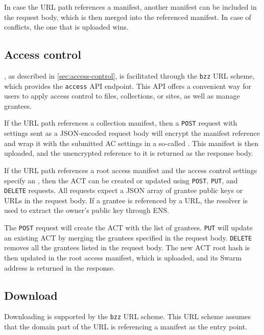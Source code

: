 In case the URL path references a manifest, another manifest can be included in the request body, which is then merged into the referenced manifest. In case of conflicts, the one that is uploaded wins. 


\subsection{Access control \statusgreen}\label{sec:access-control-ux}

, as described in  \ref{sec:access-control}, is facilitated through  the \lstinline{bzz} URL scheme, which provides the \lstinline{access} API endpoint. This API offers a convenient way for users to apply access control to files, collections, or sites, as well as manage grantees.

If the URL path references a collection manifest, then a \lstinline{POST} request with  settings sent as a JSON-encoded request body will encrypt the manifest reference and wrap it with the submitted AC settings in a so-called . This manifest is then uploaded, and the unencrypted reference to it is returned as the response body. 

If the URL path references a root access manifest and the access control settings specify an , then the ACT can be created or updated using \lstinline{POST}, \lstinline{PUT}, and \lstinline{DELETE} requests. All requests expect a JSON array of grantee public keys or URLs in the request body. If a grantee is referenced by a URL, the resolver is used to extract the owner's public key through ENS.

The \lstinline{POST} request will create the ACT with the list of grantees. \lstinline{PUT} will update an existing ACT by merging the grantees specified in the request body. \lstinline{DELETE} removes all the grantees listed in the request body. The new ACT root hash is then updated in the root access manifest, which is uploaded, and its Swarm address is returned in the response.



\subsection{Download \statusgreen}\label{sec:download}

Downloading is supported by the \lstinline{bzz} URL scheme. This URL scheme assumes that the domain part of the URL is referencing a manifest as the entry point. 

